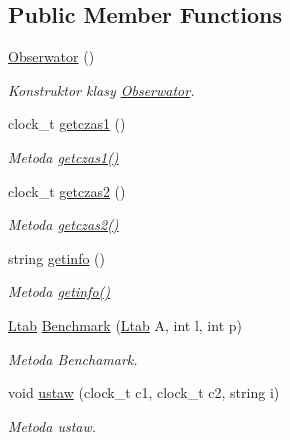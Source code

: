 \subsection*{Public Member Functions}
\begin{DoxyCompactItemize}
\item 
\hyperlink{class_obserwator_a48222b9c0db0052494f5bdd165b613d1}{Obserwator} ()
\begin{DoxyCompactList}\small\item\em Konstruktor klasy \hyperlink{class_obserwator}{Obserwator}. \end{DoxyCompactList}\item 
clock\-\_\-t \hyperlink{class_obserwator_a4b084319f11251eb6a43fda10635131b}{getczas1} ()
\begin{DoxyCompactList}\small\item\em Metoda \hyperlink{class_obserwator_a4b084319f11251eb6a43fda10635131b}{getczas1()} \end{DoxyCompactList}\item 
clock\-\_\-t \hyperlink{class_obserwator_acc32d6257452b53dad709a94708b3136}{getczas2} ()
\begin{DoxyCompactList}\small\item\em Metoda \hyperlink{class_obserwator_acc32d6257452b53dad709a94708b3136}{getczas2()} \end{DoxyCompactList}\item 
string \hyperlink{class_obserwator_a85b402505d94efaf77d955d997a7c921}{getinfo} ()
\begin{DoxyCompactList}\small\item\em Metoda \hyperlink{class_obserwator_a85b402505d94efaf77d955d997a7c921}{getinfo()} \end{DoxyCompactList}\item 
\hyperlink{class_ltab}{Ltab} \hyperlink{class_obserwator_a4f0d7830a5f9eeae6ef78967acfba0a3}{Benchmark} (\hyperlink{class_ltab}{Ltab} A, int l, int p)
\begin{DoxyCompactList}\small\item\em Metoda Benchamark. \end{DoxyCompactList}\item 
void \hyperlink{class_obserwator_a5067a980943c0706880d2dd080b88e61}{ustaw} (clock\-\_\-t c1, clock\-\_\-t c2, string i)
\begin{DoxyCompactList}\small\item\em Metoda ustaw. \end{DoxyCompactList}\end{DoxyCompactItemize}


